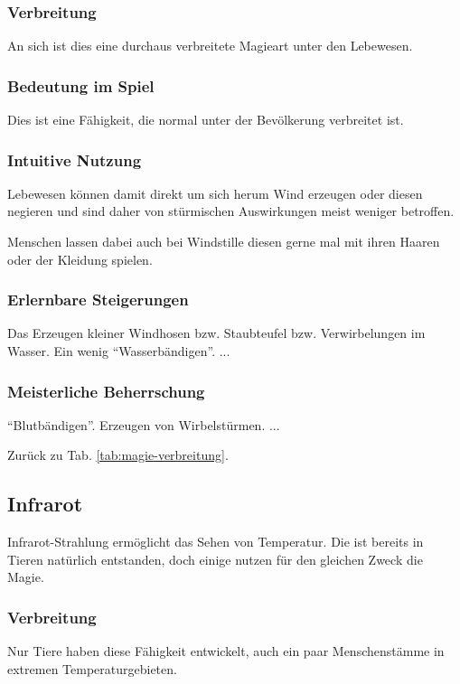 \subsubsection{Verbreitung}
An sich ist dies eine durchaus verbreitete Magieart unter den Lebewesen.

\subsubsection{Bedeutung im Spiel}
Dies ist eine Fähigkeit, die normal unter der Bevölkerung verbreitet ist.

\subsubsection{Intuitive Nutzung}
Lebewesen können damit direkt um sich herum Wind erzeugen oder diesen negieren und sind daher von stürmischen Auswirkungen meist weniger betroffen.

Menschen lassen dabei auch bei Windstille diesen gerne mal mit ihren Haaren oder der Kleidung spielen.

\subsubsection{Erlernbare Steigerungen}
\begin{outline}
	\1 Das Erzeugen kleiner Windhosen bzw. Staubteufel bzw. Verwirbelungen im Wasser.
	\1 Ein wenig "`Wasserbändigen"'.
	\1 ...
\end{outline}

\subsubsection{Meisterliche Beherrschung} 
\begin{outline}
	\1 "`Blutbändigen"'.
	\1 Erzeugen von Wirbelstürmen.
	\1 ...
\end{outline}
Zurück zu Tab. \ref{tab:magie-verbreitung}.



\subsection{Infrarot}\label{sec:infrarotmagie}
Infrarot-Strahlung ermöglicht das Sehen von Temperatur. 
Die ist bereits in Tieren natürlich entstanden, doch einige nutzen für den gleichen Zweck die Magie.

\subsubsection{Verbreitung}
Nur Tiere haben diese Fähigkeit entwickelt, auch ein paar Menschenstämme in extremen Temperaturgebieten.

